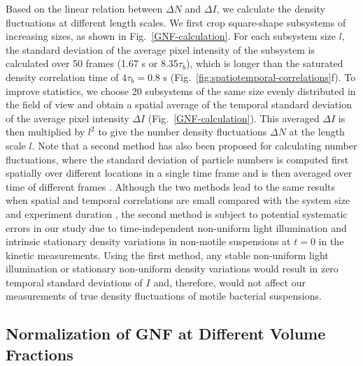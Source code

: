 Based on the linear relation between $\Delta N$ and $\Delta I$, we calculate the density fluctuations at different length scales. We first crop square-shape subsystems of increasing sizes, as shown in Fig.~\ref{GNF-calculation}. For each subsystem size $l$, the standard deviation of the average pixel intensity of the subsystem is calculated over 50 frames (1.67 s or 8.35$\tau_b$), which is longer than the saturated density correlation time of $4\tau_b = 0.8$ s (Fig.~\ref{fig:spatiotemporal-correlations}f). To improve statistics, we choose 20 subsystems of the same size evenly distributed in the field of view and obtain a spatial average of the temporal standard deviation of the average pixel intensity $\Delta I$ (Fig.~\ref{GNF-calculation}). This averaged $\Delta I$ is then multiplied by $l^2$ to give the number density fluctuations $\Delta N$ at the length scale $l$. Note that a second method has also been proposed for calculating number fluctuations, where the standard deviation of particle numbers is computed first spatially over different locations in a single time frame and is then averaged over time of different frames \cite{Aranson2008}.  Although the two methods lead to the same results when spatial and temporal correlations are small compared with the system size and experiment duration \cite{Aranson2008}, the second method is subject to potential systematic errors in our study due to time-independent non-uniform light illumination and intrinsic stationary density variations in non-motile suspensions at $t=0$ in the kinetic measurements. Using the first method, any stable non-uniform light illumination or stationary non-uniform density variations would result in zero temporal standard deviations of $I$ and, therefore, would not affect our measurements of true density fluctuations of motile bacterial suspensions.


\subsection{Normalization of GNF at Different Volume Fractions}

